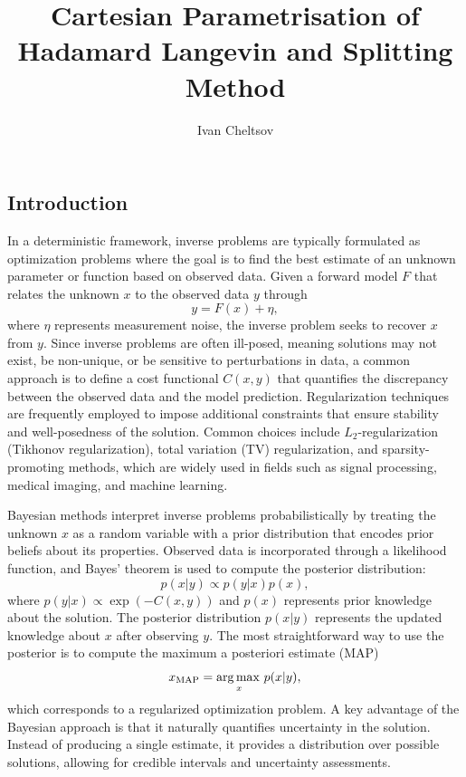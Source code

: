 \documentclass{article}
\title{Cartesian Parametrisation of Hadamard Langevin and Splitting Method}
\author{%
 Ivan Cheltsov
}
\begin{document}
\maketitle
\subsection{Introduction}
In a deterministic framework, inverse problems are typically formulated as optimization problems where the goal is to find the best estimate of an unknown parameter or function based on observed data. Given a forward model $F$ that relates the unknown $x$ to the observed data $y$ through
\begin{equation} \label{x_opt}
y = F(x) + \eta,
\end{equation}
where $\eta$ represents measurement noise, the inverse problem seeks to recover $x$ from $y$. Since inverse problems are often ill-posed, meaning solutions may not exist, be non-unique, or be sensitive to perturbations in data, a common approach is to define a cost functional $C(x,y)$ that quantifies the discrepancy between the observed data and the model prediction. Regularization techniques are frequently employed to impose additional constraints that ensure stability and well-posedness of the solution. Common choices include $L_2$-regularization (Tikhonov regularization), total variation (TV) regularization, and sparsity-promoting methods, which are widely used in fields such as signal processing, medical imaging, and machine learning.

Bayesian methods interpret inverse problems probabilistically by treating the unknown $x$ as a random variable with a prior distribution that encodes prior beliefs about its properties. Observed data is incorporated through a likelihood function, and Bayes’ theorem is used to compute the posterior distribution:
\begin{equation}
p(x | y) \propto p(y | x) p(x),
\end{equation}
where $p(y | x) \propto \exp(-C(x,y))$ and $p(x)$ represents prior knowledge about the solution. The posterior distribution $p(x | y)$ represents the updated knowledge about $x$ after observing $y$. The most straightforward way to use the posterior is to compute the maximum a posteriori estimate (MAP)
\begin{equation} \label{x_map}
x_{\text{MAP}} = \operatorname*{arg\, max \,}_{x} p(x | y),
\end{equation}
which corresponds to a regularized optimization problem. A key advantage of the Bayesian approach is that it naturally quantifies uncertainty in the solution. Instead of producing a single estimate, it provides a distribution over possible solutions, allowing for credible intervals and uncertainty assessments.
\end{document}
